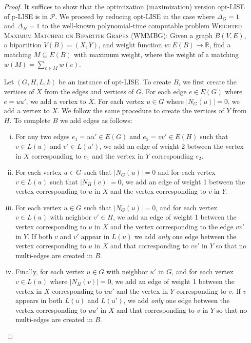 \documentclass[11pt]{article}
\newcommand{\Pol}{\mbox{$\mathcal P$}}
\begin{document}
\begin{proof}
It suffices to show that the optimization (maximization) version opt-LISE of p-LISE is in $\Pol$. We proceed by reducing opt-LISE in the case where $\Delta_G=1$ and $\Delta_H=1$ to the well-known polynomial-time computable problem \textsc{Weighted Maximum Matching on Bipartite Graphs} (WMMBG):  Given a graph $B(V, E)$, a bipartition $V(B) = (X, Y)$, and weight function $w : E(B) \to \mathbb{R}$, find a matching $M \subseteq E(B)$ with maximum weight, where the weight of a matching $w(M) = \sum_{e \in M} w(e)$.

Let $(G, H, L, k)$ be an instance of opt-LISE.  To create $B$, we first create the vertices of $X$ from the edges and vertices of $G$.  For each edge $e \in E(G)$ where $e = uu'$, we add a vertex to $X$.  For each vertex $u \in G$ where $|N_G(u)| = 0$, we add a vertex to $X$.  We follow the same procedure to create the vertices of $Y$ from $H$.  To complete $B$ we add edges as follows:

\begin{enumerate}[(i)]
 \item For any two edges $e_1=uu' \in E(G)$ and $e_2=vv' \in E(H)$ such that $v \in L(u)$ and $v' \in L(u')$, we add an edge of weight 2 between the vertex in $X$ corresponding to $e_1$ and the vertex in $Y$ corresponding $e_2$.
 \item For each vertex $u \in G$ such that $|N_G(u)| = 0$ and for each vertex $v \in L(u)$ such that $|N_H(v)| = 0$, we add an edge of weight 1 between the vertex corresponding to $u$ in $X$ and the vertex corresponding to $v$ in $Y$.

 \item For each vertex $u \in G$ such that $|N_G(u)| = 0$, and for each vertex $v \in L(u)$ with neighbor $v' \in H$, we add an edge of weight 1 between the vertex corresponding to $u$ in $X$ and the vertex corresponding to the edge $vv'$ in $Y$. If both $v$ and $v'$ appear in $L(u)$ we add {\em only} one edge between the vertex corresponding to $u$ in $X$ and that corresponding to $vv'$ in $Y$ so that no multi-edges are created in $B$.

 \item Finally, for each vertex $u \in G$ with neighbor $u'$ in $G$, and for each vertex $v \in L(u)$ where $|N_H(v)| = 0$, we add an edge of weight 1 between the vertex in $X$ corresponding to $uu'$ and the vertex in $Y$ corresponding to $v$. If $v$ appears in both $L(u)$ and $L(u')$, we add {\em only} one edge between the vertex corresponding to $uu'$ in $X$ and that corresponding to $v$ in $Y$ so that no multi-edges are created in $B$.
\end{enumerate}


\end{proof}
\end{document}
